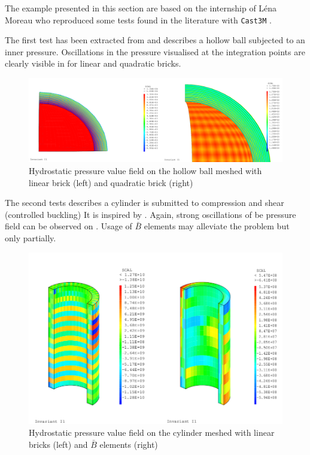 The example presented in this section are based on the internship of
Léna Moreau who reproduced some tests found in the literature with
\texttt{Cast3M} \footnotemark[1].


The first test has been extracted from \cite{2016_ZHANG_These} and
describes a hollow ball subjected to an inner pressure. Oscillations in
the pressure visualised at the integration points are clearly visible in
 for linear and quadratic bricks.


\begin{figure}[h!]
    \centering
    \includegraphics[width=7.cm]{img/HB-cub8-cu20.png}
    \caption{Hydrostatic pressure value field on the hollow ball meshed with linear brick (left) and quadratic brick (right)}
    \label{fig_hollow_ball}
\end{figure}

The second tests describes a cylinder is submitted to compression and
shear (controlled buckling) It is inspired by \cite{abbas_hybrid_2018}.
Again, strong oscillations of be pressure field can be observed on
. Usage of $\bar{B}$ elements may
alleviate the problem but only partially.

\begin{figure}[h!]
    \centering
    \includegraphics[width=7.cm]{img/Cylinder-cu-bbar.png}
    \caption{Hydrostatic pressure value field on the cylinder meshed with linear bricks (left) and $\bar{B}$ elements (right)}
    \label{fig_cylinder_test}
\end{figure}